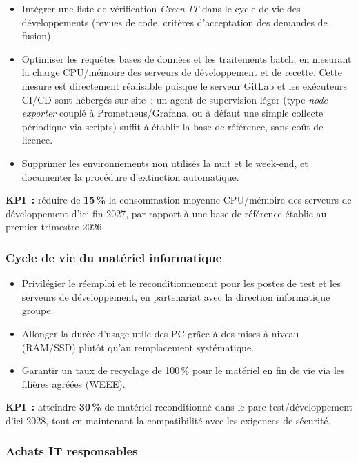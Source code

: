 \begin{itemize}
    \item Intégrer une liste de vérification \textit{Green IT} dans le cycle de vie des développements (revues de code, critères d'acceptation des demandes de fusion).
    \item Optimiser les requêtes bases de données et les traitements batch, en mesurant la charge CPU/mémoire des serveurs de développement et de recette. Cette mesure est directement réalisable puisque le serveur GitLab et les exécuteurs CI/CD sont hébergés sur site~: un agent de supervision léger (type \textit{node exporter} couplé à Prometheus/Grafana, ou à défaut une simple collecte périodique via scripts) suffit à établir la base de référence, sans coût de licence.
    \item Supprimer les environnements non utilisés la nuit et le week-end, et documenter la procédure d'extinction automatique.
\end{itemize}

\textbf{KPI~:} réduire de \textbf{15\,\%} la consommation moyenne CPU/mémoire des serveurs de développement d'ici fin 2027, par rapport à une base de référence établie au premier trimestre 2026.

\subsubsection*{Cycle de vie du matériel informatique}

\begin{itemize}
    \item Privilégier le réemploi et le reconditionnement pour les postes de test et les serveurs de développement, en partenariat avec la direction informatique groupe.
    \item Allonger la durée d'usage utile des PC grâce à des mises à niveau (RAM/SSD) plutôt qu'au remplacement systématique.
    \item Garantir un taux de recyclage de 100\,\% pour le matériel en fin de vie via les filières agréées (WEEE).
\end{itemize}

\textbf{KPI~:} atteindre \textbf{30\,\%} de matériel reconditionné dans le parc test/développement d'ici 2028, tout en maintenant la compatibilité avec les exigences de sécurité.

\subsubsection*{Achats IT responsables}

